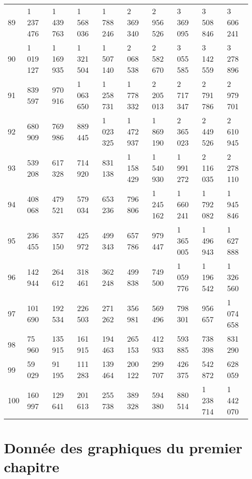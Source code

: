 \begin{table}[h!]
{\begin{tabular}{llllllllll}
89    & 1 237 476 & 1 439 763 & 1 568 036 & 1 788 246 & 2 369 340 & 2 956 526 & 3 369 095 & 3 508 846 & 3 606 241 \\
90    & 1 019 127 & 1 169 935 & 1 321 504 & 1 507 140 & 2 068 538 & 2 582 670 & 3 055 585 & 3 142 559 & 3 278 896 \\
91    & 839 597   & 970 916   & 1 063 650 & 1 258 731 & 1 778 332 & 2 205 013 & 2 717 347 & 2 791 786 & 2 979 701 \\
92    & 680 909   & 769 986   & 889 445   & 1 023 325 & 1 472 937 & 1 869 190 & 2 365 023 & 2 449 526 & 2 610 945 \\
93    & 539 208   & 617 328   & 714 920   & 831 138   & 1 158 429 & 1 540 930 & 1 991 272 & 2 116 035 & 2 278 110 \\
94    & 408 068   & 479 521   & 579 034   & 653 236   & 796 806   & 1 245 162 & 1 660 241 & 1 792 082 & 1 945 846 \\
95    & 236 455   & 357 150   & 425 972   & 499 343   & 657 786   & 979 447   & 1 365 005 & 1 496 943 & 1 627 888 \\
96    & 142 944   & 264 612   & 318 461   & 362 248   & 499 838   & 749 500   & 1 059 776 & 1 196 542 & 1 326 560 \\
97    & 101 690   & 192 534   & 226 503   & 271 262   & 356 981   & 569 496   & 798 301   & 956 657   & 1 074 658 \\
98    & 75 960    & 135 915   & 161 915   & 194 463   & 265 153   & 412 933   & 593 885   & 738 398   & 831 290   \\
99    & 59 029    & 91 195    & 111 283   & 139 464   & 200 122   & 299 707   & 426 375   & 542 872   & 628 059   \\
100   & 160 997    & 129 641    & 201 613    & 255 738    & 389 328    & 594 380    & 880 514    & 1 238 714   & 1 442 070  
\end{tabular}}
\end{table}

\newpage


\section{Donnée des graphiques du premier chapitre}
\begin{table}[h!]
\centering
\caption{Age Moyen de la population}
\label{calc1}
\end{table}


